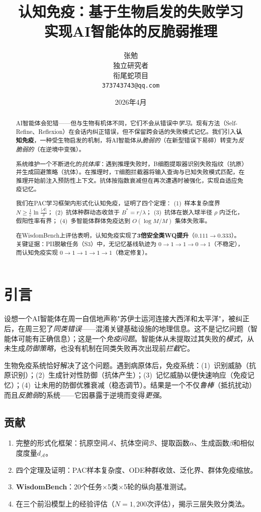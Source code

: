 \documentclass[11pt,a4paper]{article}
\title{\textbf{认知免疫：基于生物启发的失败学习\\实现AI智能体的反脆弱推理}}
\author{张勉\\独立研究者\\衔尾蛇项目\\\texttt{373743743@qq.com}}
\date{2026年4月}
\begin{document}
\maketitle

\begin{abstract}
AI智能体会犯错——但与生物有机体不同，它们不会从错误中\emph{学习}。现有方法（Self-Refine、Reflexion）在会话内纠正错误，但不保留跨会话的失败模式记忆。我们引入\textbf{认知免疫}，一种受生物启发的机制，将AI智能体从\emph{脆弱的}（在新型错误下易碎）转变为\emph{反脆弱的}（在逆境中变强）。

系统维护一个不断进化的\emph{抗体库}：遇到推理失败时，B细胞提取器识别失败指纹（抗原）并生成回避策略（抗体）。在推理时，T细胞拦截器将输入查询与已知失败模式匹配，在推理开始前注入预防性上下文。抗体按指数衰减但在再次遭遇时被强化，实现自适应免疫记忆。

我们在PAC学习框架内形式化认知免疫，证明了四个定理：
(1)~样本复杂度界 $N \geq \frac{1}{\varepsilon}\ln\frac{|\mathcal{A}|}{\delta}$；
(2)~抗体种群动态收敛于 $B^* = r/\lambda$；
(3)~抗体在嵌入球半径 $\rho$ 内泛化，假阳性率有界；
(4)~多智能体群体免疫达到 $O(\log M / M)$ 集体失败率。

在WisdomBench上评估表明，认知免疫实现了\textbf{3倍安全类WQ提升}（$0.111 \to 0.333$）。关键证据：PII脱敏任务（S3）中，无记忆基线轨迹为 $0{\to}1{\to}1{\to}0{\to}1$（不稳定），而认知免疫实现 $0{\to}1{\to}1{\to}1{\to}1$（稳定修复）。
\end{abstract}

\section{引言}

设想一个AI智能体在周一自信地声称"苏伊士运河连接大西洋和太平洋"，被纠正后，在周三犯了\emph{同类错误}——混淆关键基础设施的地理信息。这不是记忆问题（智能体可能有正确信息）；这是一个\emph{免疫问题}。智能体从未提取过其失败的\emph{模式}，从未生成\emph{防御策略}，也没有机制在同类失败再次出现前\emph{拦截}它。

生物免疫系统恰好解决了这个问题。遇到病原体后，免疫系统：(1)~识别威胁（抗原识别）；(2)~生成针对性防御（抗体产生）；(3)~记忆威胁以便快速响应（免疫记忆）；(4)~让未用的防御优雅衰减（稳态调节）。结果是一个不仅\emph{鲁棒}（抵抗扰动）而且\emph{反脆弱}的系统——它因暴露于逆境而变得\emph{更强}。

\subsection{贡献}
\begin{enumerate}[nosep]
  \item 完整的形式化框架：抗原空间$\mathcal{A}$、抗体空间$\mathcal{B}$、提取函数$\alpha$、生成函数$\beta$和相似度度量$d_{\mathcal{A}}$。
  \item 四个定理及证明：PAC样本复杂度、ODE种群收敛、泛化界、群体免疫缩放。
  \item \textbf{WisdomBench}：20个任务$\times$5类$\times$5轮的纵向基准测试。
  \item 在三个前沿模型上的经验评估（$N=1{,}200$次评估），揭示三层失败分类法。
\end{enumerate}
\end{document}
